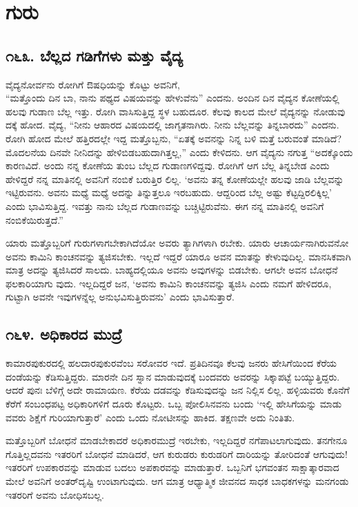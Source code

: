 \chapter{ಗುರು}

\section{\num{೧೬೩. } ಬೆಲ್ಲದ ಗಡಿಗೆಗಳು ಮತ್ತು ವೈದ್ಯ}

ವೈದ್ಯನೋರ್ವನು ರೋಗಿಗೆ ಔಷಧಿಯನ್ನು ಕೊಟ್ಟು ಅವನಿಗೆ,\\“ಮತ್ತೊಂದು ದಿನ ಬಾ, ನಾನು ಪಥ್ಯದ ವಿಷಯವನ್ನು ಹೇಳುವೆನು” ಎಂದನು. ಅಂದಿನ ದಿನ ವೈದ್ಯನ ಕೋಣೆಯಲ್ಲಿ ಹಲವು ಗುಡಾಣ ಬೆಲ್ಲ ಇತ್ತು. ರೋಗಿ ವಾಸಿಸುತ್ತಿದ್ದ ಸ್ಥಳ ಬಹುದೂರ. ಕೆಲವು ಕಾಲದ ಮೇಲೆ ವೈದ್ಯನನ್ನು ನೋಡುವು ದಕ್ಕೆ ಹೋದ. ವೈದ್ಯ, “ನೀನು ಆಹಾರದ ವಿಷಯದಲ್ಲಿ ಜಾಗೃತನಾಗಿರು. ನೀನು ಬೆಲ್ಲವನ್ನು ತಿನ್ನಬಾರದು” ಎಂದನು. ರೋಗಿ ಹೋದ ಮೇಲೆ ಹತ್ತಿರದಲ್ಲೇ ಇದ್ದ ಮತ್ತೊಬ್ಬನು, “ಏತಕ್ಕೆ ಅವನನ್ನು ನಿನ್ನ ಬಳಿ ಮತ್ತೆ ಬರುವಂತೆ ಮಾಡಿದೆ? ಮೊದಲನೆಯ ದಿನವೇ ನೀನಿದನ್ನು ಹೇಳಿಬಿಡಬಹುದಾಗಿತ್ತಲ್ಲ,” ಎಂದು ಕೇಳಿದನು. ಆಗ ವೈದ್ಯನು ನಗುತ್ತ “ಅದಕ್ಕೊಂದು ಕಾರಣವಿದೆ. ಅಂದು ನನ್ನ ಕೋಣೆಯ ತುಂಬ ಬೆಲ್ಲದ ಗುಡಾಣಗಳಿದ್ದವು. ರೋಗಿಗೆ ಆಗ ಬೆಲ್ಲ ತಿನ್ನಬೇಡ ಎಂದು ಹೇಳಿದ್ದರೆ ನನ್ನ ಮಾತಿನಲ್ಲಿ ಅವನಿಗೆ ನಂಬಿಕೆ ಬರುತ್ತಿರ ಲಿಲ್ಲ. ‘ಅವನು ತನ್ನ ಕೋಣೆಯಲ್ಲೇ ಹಲವು ಜಾಡಿ ಬೆಲ್ಲವನ್ನು ಇಟ್ಟಿರುವನು. ಅವನು ಮಧ್ಯೆ ಮಧ್ಯೆ ಅದನ್ನು ತಿನ್ನುತ್ತಲೂ ಇರಬಹುದು. ಆದ್ದರಿಂದ ಬೆಲ್ಲ ಅಷ್ಟು ಕೆಟ್ಟದ್ದಿರಲಿಕ್ಕಿಲ್ಲ’ ಎಂದು ಭಾವಿಸುತ್ತಿದ್ದ. ಇವತ್ತು ನಾನು ಬೆಲ್ಲದ ಗುಡಾಣವನ್ನು ಬಚ್ಚಿಟ್ಟಿರುವೆನು. ಈಗ ನನ್ನ ಮಾತಿನಲ್ಲಿ ಅವನಿಗೆ ನಂಬಿಕೆಯಿರುತ್ತದೆ.”

ಯಾರು ಮತ್ತೊಬ್ಬರಿಗೆ ಗುರುಗಳಾಗಬೇಕಾಗಿದೆಯೋ ಅವರು ತ್ಯಾಗಿಗಳಾಗಿ ರಬೇಕು. ಯಾರು ಆಚಾರ್ಯನಾಗಿರುವನೋ ಅವನು ಕಾಮಿನಿ ಕಾಂಚನವನ್ನು ತ್ಯಜಿಸಬೇಕು. ಇಲ್ಲದೆ ಇದ್ದರೆ ಯಾರೂ ಅವನ ಮಾತನ್ನು ಕೇಳುವುದಿಲ್ಲ. ಮಾನಸಿಕವಾಗಿ ಮಾತ್ರ ಅದನ್ನು ತ್ಯಜಿಸಿದರೆ ಸಾಲದು. ಬಾಹ್ಯದಲ್ಲಿಯೂ ಅವನು ಅವುಗಳನ್ನು ಬಿಡಬೇಕು. ಆಗಲೇ ಅವನ ಬೋಧನೆ ಫಲಕಾರಿಯಾಗು ವುದು. ಇಲ್ಲದಿದ್ದರೆ ಜನ, ‘ಅವನು ಕಾಮಿನಿ ಕಾಂಚನವನ್ನು ತ್ಯಜಿಸಿ ಎಂದು ನಮಗೆ ಹೇಳಿದರೂ, ಗುಟ್ಟಾಗಿ ಅವನೇ ಇವುಗಳನ್ನೆಲ್ಲ ಅನುಭವಿಸುತ್ತಿರುವನು’ ಎಂದು ಭಾವಿಸುತ್ತಾರೆ.


\section{\num{೧೬೪. } ಅಧಿಕಾರದ ಮುದ್ರೆ}

ಕಾಮಾರಪುಕುರದಲ್ಲಿ ಹಲದಾರಪುಕುರವೆಂಬ ಸರೋವರ ಇದೆ. ಪ್ರತಿದಿನವೂ ಕೆಲವು ಜನರು ಹೇಸಿಗೆಯಿಂದ ಕೆರೆಯ ದಂಡೆಯನ್ನು ಕೆಡಿಸುತ್ತಿದ್ದರು. ಮಾರನೇ ದಿನ ಸ್ನಾನ ಮಾಡುವುದಕ್ಕೆ ಬಂದವರು ಅವರನ್ನು ಸಿಕ್ಕಾಪಟ್ಟೆ ಬಯ್ಯುತ್ತಿದ್ದರು. ಆದರೆ ಪುನಃ ಬೆಳಿಗ್ಗೆ ಅದೇ ರಾಮಾಯಣ. ಕೆರೆಯ ದಡವನ್ನು ಕೆಡಿಸುವುದನ್ನು ಜನ ನಿಲ್ಲಿಸ ಲಿಲ್ಲ. ಹಳ್ಳಿಯವರು ಕೊನೆಗೆ ಕೆರೆಗೆ ಸಂಬಂಧಪಟ್ಟ ಅಧಿಕಾರಿಗಳಿಗೆ ದೂರು ಕೊಟ್ಟರು. ಒಬ್ಬ ಪೋಲಿಸಿನವನು ಬಂದು ‘ಇಲ್ಲಿ ಹೇಸಿಗೆಯನ್ನು ಮಾಡು ವವರು ಶಿಕ್ಷೆಗೆ ಗುರಿಯಾಗುತ್ತಾರೆ’ ಎಂದು ಒಂದು ನೋಟೀಸನ್ನು ಹಾಕಿದ. ತಕ್ಷಣವೇ ಅದು ನಿಂತಿತು.

ಮತ್ತೊಬ್ಬರಿಗೆ ಬೋಧನೆ ಮಾಡಬೇಕಾದರೆ ಅಧಿಕಾರಮುದ್ರೆ ಇರಬೇಕು, ಇಲ್ಲದಿದ್ದರೆ ನಗೆಪಾಟಲಾಗುವುದು. ತನಗೇನೂ ಗೊತ್ತಿಲ್ಲದವನು ಇತರರಿಗೆ ಬೋಧನೆ ಮಾಡಿದರೆ, ಆಗ ಕುರುಡರು ಕುರುಡರಿಗೆ ದಾರಿಯನ್ನು ತೋರಿದಂತೆ ಆಗುವುದು! ಇತರರಿಗೆ ಉಪಕಾರವನ್ನು ಮಾಡುವ ಬದಲು ಅಪಕಾರವನ್ನು ಮಾಡುತ್ತಾರೆ. ಒಬ್ಬನಿಗೆ ಭಗವಂತನ ಸಾಕ್ಷಾತ್ಕಾರವಾದ ಮೇಲೆ ಅವನಿಗೆ ಅಂತರ್​ದೃಷ್ಟಿ ಉಂಟಾಗುವುದು. ಆಗ ಮಾತ್ರ ಆಧ್ಯಾತ್ಮಿಕ ಜೀವನದ ಸಾಧಕ ಬಾಧಕಗಳನ್ನು ಮನಗಂಡು ಇತರರಿಗೆ ಅವನು ಬೋಧಿಸಬಲ್ಲ.


